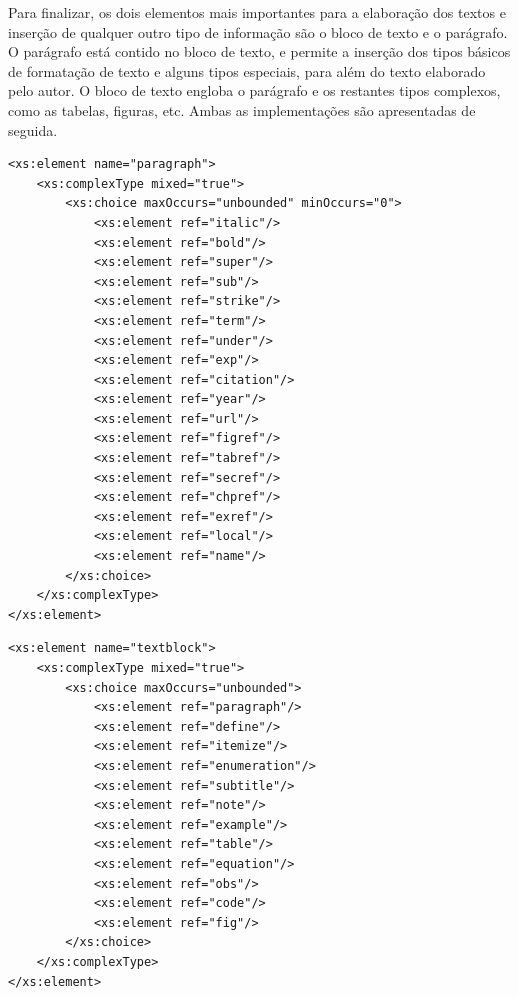 \documentclass[a4paper]{article}
\begin{document}
\hspace{1cm}Para finalizar, os dois elementos mais importantes para a elaboração dos textos e inserção de qualquer outro tipo de informação são o bloco de texto e o parágrafo. O parágrafo está contido no bloco de texto, e permite a inserção dos tipos básicos de formatação de texto e alguns tipos especiais, para além do texto elaborado pelo autor. O bloco de texto engloba o parágrafo e os restantes tipos complexos, como as tabelas, figuras, etc. Ambas as implementações são apresentadas de seguida.\\

\begin{small}
\begin{lstlisting}
<xs:element name="paragraph">
    <xs:complexType mixed="true">
        <xs:choice maxOccurs="unbounded" minOccurs="0">
            <xs:element ref="italic"/>
            <xs:element ref="bold"/>
            <xs:element ref="super"/>
            <xs:element ref="sub"/>
            <xs:element ref="strike"/>
            <xs:element ref="term"/>
            <xs:element ref="under"/>
            <xs:element ref="exp"/>
            <xs:element ref="citation"/>
            <xs:element ref="year"/>
            <xs:element ref="url"/>
            <xs:element ref="figref"/>
            <xs:element ref="tabref"/>
            <xs:element ref="secref"/>
            <xs:element ref="chpref"/>
            <xs:element ref="exref"/>
            <xs:element ref="local"/>
            <xs:element ref="name"/>
        </xs:choice>
    </xs:complexType>
</xs:element>
\end{lstlisting}
\begin{center}
\begin{footnotesize}
\caption{Disposição do parágrafo no \verb|schema|}
\end{footnotesize}
\end{center}
\end{small}

\begin{small}
\begin{lstlisting}
<xs:element name="textblock">
    <xs:complexType mixed="true">
        <xs:choice maxOccurs="unbounded">
            <xs:element ref="paragraph"/>
            <xs:element ref="define"/>
            <xs:element ref="itemize"/>
            <xs:element ref="enumeration"/>
            <xs:element ref="subtitle"/>
            <xs:element ref="note"/>
            <xs:element ref="example"/>
            <xs:element ref="table"/>
            <xs:element ref="equation"/>
            <xs:element ref="obs"/>
            <xs:element ref="code"/>
            <xs:element ref="fig"/>
        </xs:choice>
    </xs:complexType>
</xs:element>
\end{lstlisting}
\begin{center}
\begin{footnotesize}
\caption{Disposição do bloco de texto no \verb|schema|}
\end{footnotesize}
\end{center}
\end{small}
\end{document}
